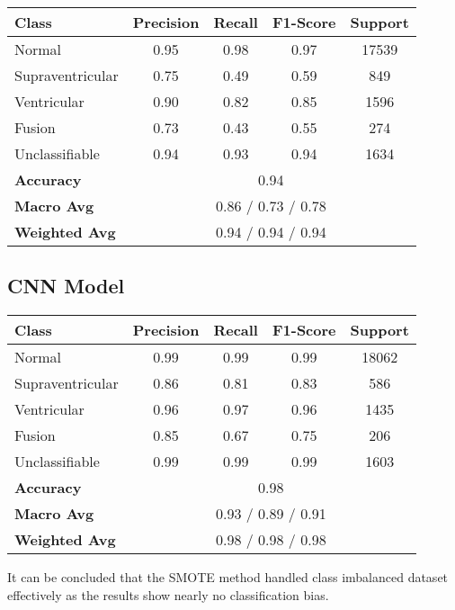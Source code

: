 \documentclass[]{acmsiggraph}
\begin{document}
\begin{center}
\begin{tabular}{lcccc}
\hline
\textbf{Class} & \textbf{Precision} & \textbf{Recall} & \textbf{F1-Score} & \textbf{Support} \\
\hline
Normal & 0.95 & 0.98 & 0.97 & 17539 \\
Supraventricular & 0.75 & 0.49 & 0.59 & 849 \\
Ventricular & 0.90 & 0.82 & 0.85 & 1596 \\
Fusion & 0.73 & 0.43 & 0.55 & 274 \\
Unclassifiable & 0.94 & 0.93 & 0.94 & 1634 \\
\hline
\textbf{Accuracy} & \multicolumn{4}{c}{0.94} \\
\textbf{Macro Avg} & \multicolumn{4}{c}{0.86 / 0.73 / 0.78} \\
\textbf{Weighted Avg} & \multicolumn{4}{c}{0.94 / 0.94 / 0.94} \\
\hline
\end{tabular}
\end{center}


\subsection{CNN Model}

\begin{center}
\begin{tabular}{lcccc}
\hline
\textbf{Class} & \textbf{Precision} & \textbf{Recall} & \textbf{F1-Score} & \textbf{Support} \\
\hline
Normal & 0.99 & 0.99 & 0.99 & 18062 \\
Supraventricular & 0.86 & 0.81 & 0.83 & 586 \\
Ventricular & 0.96 & 0.97 & 0.96 & 1435 \\
Fusion & 0.85 & 0.67 & 0.75 & 206 \\
Unclassifiable & 0.99 & 0.99 & 0.99 & 1603 \\
\hline
\textbf{Accuracy} & \multicolumn{4}{c}{0.98} \\
\textbf{Macro Avg} & \multicolumn{4}{c}{0.93 / 0.89 / 0.91} \\
\textbf{Weighted Avg} & \multicolumn{4}{c}{0.98 / 0.98 / 0.98} \\
\hline
\end{tabular}
\end{center}

It can be concluded that the SMOTE method handled class imbalanced dataset effectively as the results show nearly no classification bias.
\end{document}
